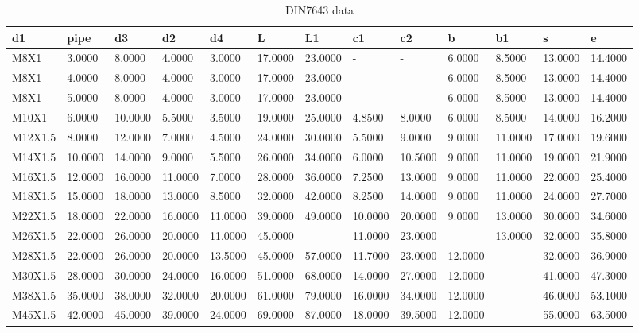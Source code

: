 \begin{table}[h!]
\begin{longtable}{l|ll|ll|ll|ll|ll|ll}
d1&  pipe&  d3&  d2&  d4&  L&  L1&  c1&  c2&  b&  b1&  s&  e\\
\hline
M8X1&  3.0000&  8.0000&  4.0000&  3.0000&  17.0000&  23.0000&  -&  -&  6.0000&  8.5000&  13.0000&  14.4000\\
M8X1&  4.0000&  8.0000&  4.0000&  3.0000&  17.0000&  23.0000&  -&  -&  6.0000&  8.5000&  13.0000&  14.4000\\
M8X1&  5.0000&  8.0000&  4.0000&  3.0000&  17.0000&  23.0000&  -&  -&  6.0000&  8.5000&  13.0000&  14.4000\\
M10X1&  6.0000&  10.0000&  5.5000&  3.5000&  19.0000&  25.0000&  4.8500&  8.0000&  6.0000&  8.5000&  14.0000&  16.2000\\
M12X1.5&  8.0000&  12.0000&  7.0000&  4.5000&  24.0000&  30.0000&  5.5000&  9.0000&  9.0000&  11.0000&  17.0000&  19.6000\\
M14X1.5&  10.0000&  14.0000&  9.0000&  5.5000&  26.0000&  34.0000&  6.0000&  10.5000&  9.0000&  11.0000&  19.0000&  21.9000\\
M16X1.5&  12.0000&  16.0000&  11.0000&  7.0000&  28.0000&  36.0000&  7.2500&  13.0000&  9.0000&  11.0000&  22.0000&  25.4000\\
M18X1.5&  15.0000&  18.0000&  13.0000&  8.5000&  32.0000&  42.0000&  8.2500&  14.0000&  9.0000&  11.0000&  24.0000&  27.7000\\
M22X1.5&  18.0000&  22.0000&  16.0000&  11.0000&  39.0000&  49.0000&  10.0000&  20.0000&  9.0000&  13.0000&  30.0000&  34.6000\\
M26X1.5&  22.0000&  26.0000&  20.0000&  11.0000&  45.0000&   &  11.0000&  23.0000&   &  13.0000&  32.0000&  35.8000\\
M28X1.5&  22.0000&  26.0000&  20.0000&  13.5000&  45.0000&  57.0000&  11.7000&  23.0000&  12.0000&   &  32.0000&  36.9000\\
M30X1.5&  28.0000&  30.0000&  24.0000&  16.0000&  51.0000&  68.0000&  14.0000&  27.0000&  12.0000&   &  41.0000&  47.3000\\
M38X1.5&  35.0000&  38.0000&  32.0000&  20.0000&  61.0000&  79.0000&  16.0000&  34.0000&  12.0000&   &  46.0000&  53.1000\\
M45X1.5&  42.0000&  45.0000&  39.0000&  24.0000&  69.0000&  87.0000&  18.0000&  39.5000&  12.0000&   &  55.0000&  63.5000\\
\end{longtable}
\caption{DIN7643 data}
\end{table}
\clearpage



